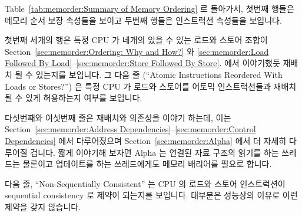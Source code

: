 Table~\ref{tab:memorder:Summary of Memory Ordering} 로 돌아가서, 첫번째 행들은
메모리 순서 보장 속성들을 보이고 두번째 행들은 인스트럭션 속성들을 보입니다.

첫번째 세개의 행은 특정 CPU 가 네개의 있을 수 있는 로드와 스토어 조합이
Section~\ref{sec:memorder:Ordering: Why and How?} 와
\ref{sec:memorder:Load Followed By Load}--\ref{sec:memorder:Store Followed By Store}.
에서 이야기했듯 재배치 될 수 있는지를 보입니다.
그 다음 줄 (``Atomic Instructions Reordered With Loads or Stores?'') 은 특정
CPU 가 로드와 스토어를 어토믹 인스트럭션들과 재배치 될 수 있게 허용하는지
여부를 보입니다.

다섯번째와 여섯번째 줄은 재배치와 의존성을 이야기 하는데, 이는
Section~\ref{sec:memorder:Address Dependencies}--\ref{sec:memorder:Control Dependencies}
에서 다루어졌으며
Section~\ref{sec:memorder:Alpha} 에서 더 자세히 다루어질 겁니다.
짧게 이야기해 보자면 Alpha 는 연결된 자료 구조의 읽기를 하는 쓰레드는 물론이고
업데이트를 하는 쓰레드에게도 메모리 배리어를 필요로 합니다.

다음 줄, ``Non-Sequentially Consistent'' 는 CPU 의 로드와 스토어 인스트럭션이
sequential consistency 로 제약이 되는지를 보입니다.
대부분은 성능상의 이유로 이런 제약을 갖지 않습니다.


